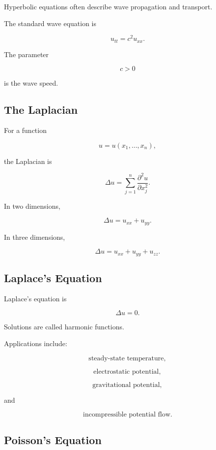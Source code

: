 Hyperbolic equations often describe wave propagation and transport.

The standard wave equation is

\[
\boxed{
u_{tt}
=
c^2u_{xx}.
}
\]

The parameter

\[
c>0
\]

is the wave speed.

\subsection{The Laplacian}
\label{subsec:laplacian}

For a function

\[
u=u(x_1,\ldots,x_n),
\]

the Laplacian is

\[
\boxed{
\Delta u
=
\sum_{j=1}^{n}
\frac{\partial^2u}{\partial x_j^2}.
}
\]

In two dimensions,

\[
\boxed{
\Delta u
=
u_{xx}+u_{yy}.
}
\]

In three dimensions,

\[
\boxed{
\Delta u
=
u_{xx}+u_{yy}+u_{zz}.
}
\]

\subsection{Laplace's Equation}
\label{subsec:laplaces-equation}

Laplace's equation is

\[
\boxed{
\Delta u=0.
}
\]

Solutions are called harmonic functions.

Applications include:

\[
\boxed{
\text{steady-state temperature},
}
\]

\[
\boxed{
\text{electrostatic potential},
}
\]

\[
\boxed{
\text{gravitational potential},
}
\]

and

\[
\boxed{
\text{incompressible potential flow}.
}
\]

\subsection{Poisson's Equation}
\label{subsec:poissons-equation}

